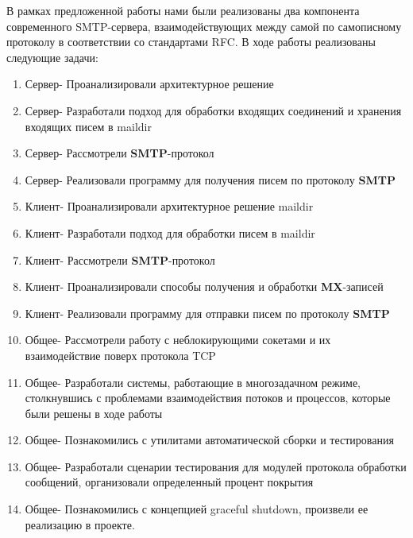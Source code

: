 \documentclass[a4paper,12pt]{report}
\begin{document}
В рамках предложенной работы нами были реализованы два компонента современного SMTP-сервера, взаимодействующих между самой по самописному протоколу в соответствии со стандартами RFC. В ходе работы реализованы следующие задачи: \\
\begin{enumerate}
	\item Сервер- Проанализировали архитектурное решение
    \item Сервер- Разработали подход для обработки входящих соединений и хранения входящих писем в maildir
    \item Сервер- Рассмотрели \textbf{SMTP}-протокол
    \item Сервер- Реализовали программу для получения писем по протоколу \textbf{SMTP}
    \item Клиент- Проанализировали архитектурное решение maildir
    \item Клиент- Разработали подход для обработки писем в maildir 
    \item Клиент- Рассмотрели \textbf{SMTP}-протокол
    \item Клиент- Проанализировали способы получения и обработки \textbf{MX}-записей
    \item Клиент- Реализовали программу для отправки писем по протоколу \textbf{SMTP}
    \item Общее- Рассмотрели работу с неблокирующими сокетами и их взаимодействие поверх протокола TCP
    \item Общее- Разработали системы, работающие в многозадачном режиме, столкнувшись с проблемами взаимодействия потоков и процессов, которые были решены в ходе работы
    \item Общее- Познакомились с утилитами автоматической сборки и тестирования
    \item Общее- Разработали сценарии тестирования для модулей протокола обработки сообщений, организовали определенный процент покрытия
    \item Общее- Познакомились с концепцией graceful shutdown, произвели ее реализацию в проекте.
\end{enumerate}
\end{document}
